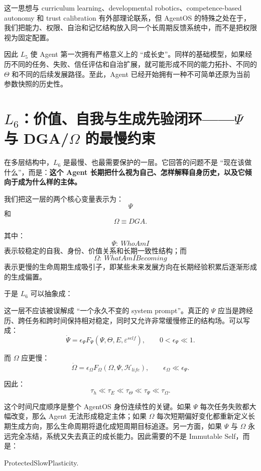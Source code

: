 这一思想与 curriculum learning、developmental robotics、competence-based autonomy 和 trust calibration 有外部理论联系，但 AgentOS 的特殊之处在于，我们把能力、权限、自治和记忆结构放入同一个长周期反馈系统中，而不是把权限视为固定配置。

因此 $L_5$ 使 Agent 第一次拥有严格意义上的 ``成长史''。同样的基础模型，如果经历不同的任务、失败、信任评估和自治扩展，就可能形成不同的能力拓扑、不同的 $\Theta$ 和不同的后续发展路径。至此，Agent 已经开始拥有一种不可简单还原为当前参数快照的历史性。

\section{$L_6$：价值、自我与生成先验闭环——$\Psi$ 与 DGA/$\Omega$ 的最慢约束}

在多层结构中，$L_6$ 是最慢、也最需要保护的一层。它回答的问题不是 ``现在该做什么''，而是：\textbf{这个 Agent 长期把什么视为自己、怎样解释自身历史，以及它倾向于成为什么样的主体。}

我们把这一层的两个核心变量表示为：
\[
\Psi
\]
和
\[
\Omega\equiv DGA.
\]

其中：
\[
\boxed{
\Psi:\ WhoAmI
}
\]
表示较稳定的自我、身份、价值关系和长期一致性结构；而
\[
\boxed{
\Omega:\ WhatAmIBecoming
}
\]
表示更慢的生命周期生成吸引子，即某些未来发展方向在长期经验积累后逐渐形成的生成偏置。

于是 $L_6$ 可以抽象成：
\begin{statementbox}
\centering
{}
\end{statementbox}

这一层不应该被误解成 ``一个永久不变的 system prompt''。真正的 $\Psi$ 应当是跨经历、跨任务和跨时间保持相对稳定，同时又允许非常缓慢修正的结构场。可以写成：
\[
\dot{\Psi}
=
\epsilon_\Psi
F_\Psi
\left(
\Psi,
\Theta,
E,
\varepsilon^{self}
\right),
\qquad
0<\epsilon_\Psi\ll 1.
\]

而 $\Omega$ 应更慢：
\[
\dot{\Omega}
=
\epsilon_\Omega
F_\Omega
\left(
\Omega,
\Psi,
\mathcal H_{life}
\right),
\qquad
\epsilon_\Omega
\ll
\epsilon_\Psi.
\]

因此：
\[
\boxed{
\tau_h
\ll
\tau_E
\ll
\tau_\Theta
\ll
\tau_\Psi
\ll
\tau_\Omega.
}
\]

这个时间尺度顺序是整个 AgentOS 身份连续性的关键。如果 $\Psi$ 每次任务失败都大幅改变，那么 Agent 无法形成稳定主体；如果 $\Omega$ 每次短期偏好变化都重新定义长期生成方向，那么生命周期将退化成短周期目标追逐。另一方面，如果 $\Psi$ 与 $\Omega$ 永远完全冻结，系统又失去真正的成长能力。因此需要的不是 Immutable Self，而是：
\begin{statementbox}
ProtectedSlowPlasticity.
\end{statementbox}

